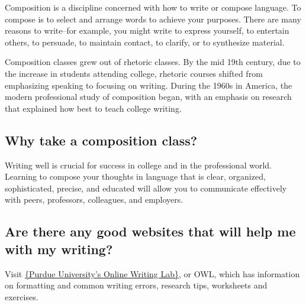 Composition is a discipline concerned with how to write or compose language. To 
compose is to select and arrange words to achieve your purposes. There are many 
reasons to write--for example, you might write to express yourself, to entertain others, 
to persuade, to maintain contact, to clarify, or to synthesize material.

Composition classes grew out of rhetoric classes. By the mid 19th century, due to the 
increase in students attending college, rhetoric courses shifted from emphasizing 
speaking to focusing on writing. During the 1960s in America, the modern professional 
study of composition began, with an emphasis on research that explained how best to 
teach college writing.
 
\subsection{Why take a composition class?}

Writing well is crucial for success in college and in the professional world. Learning to 
compose your thoughts in language that is clear, organized, sophisticated, precise, and 
educated will allow you to communicate effectively with peers, professors, colleagues, 
and employers.


\subsection{Are there any good websites that will help me with my writing?}
Visit \href{http://owl.english.purdue.edu}{\{Purdue University's Online Writing Lab\}}, or 
OWL, which has information on formatting and common writing errors, research tips, 
worksheets and exercises.


